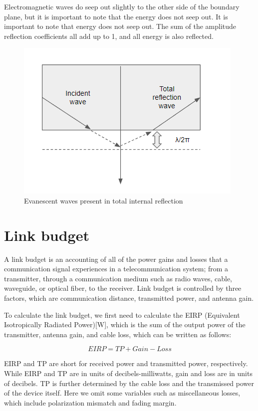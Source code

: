 \documentclass[a4paper,12pt]{report}
\begin{document}
Electromagnetic waves do seep out slightly
to the other side of the boundary plane,
but it is important to note that the energy does not seep out.
It is important to note that energy does not seep out.
The sum of the amplitude reflection coefficients all add up to 1,
and all energy is also reflected.

\begin{figure}
  \begin{center}
    \includegraphics[clip, keepaspectratio, width=0.5\linewidth]{img/insertion_reflection_evanescence.png}
    \caption{Evanescent waves present in total internal reflection}
    \label{fig:insertion_reflection_evanescent}
  \end{center}
\end{figure}


\section{Link budget}

A link budget is an accounting of all of the power gains and losses
that a communication signal experiences in a telecommunication system;
from a transmitter, through a communication medium such as radio waves,
cable, waveguide, or optical fiber, to the receiver.
Link budget is controlled by three factors, 
which are communication distance, transmitted power, and antenna gain.

To calculate the link budget,
we first need to calculate the EIRP (Equivalent Isotropically Radiated Power)[W],
which is the sum of the output power of the transmitter, antenna gain, and cable loss,
which can be written as follows:

\begin{equation}
  EIRP = TP + Gain - Loss
\end{equation}

EIRP and TP are short for received power and transmitted power, respectively.
While EIRP and TP are in units of decibels-milliwatts,
gain and loss are in units of decibels.
TP is further determined by the cable loss and the transmissed power
of the device itself.
Here we omit some variables such as miscellaneous losses,
which include polarization mismatch and fading margin.
\end{document}
